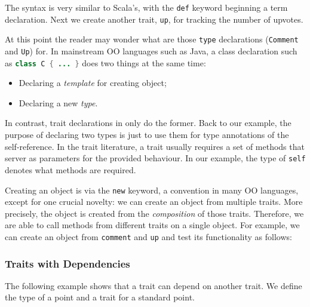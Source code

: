 
The syntax is very similar to Scala's, with the \lstinline{def} keyword
beginning a term declaration. Next we create another trait, \lstinline$up$, for
tracking the number of upvotes.


At this point the reader may wonder what are those \lstinline{type} declarations
(\lstinline$Comment$ and \lstinline$Up$) for. In mainstream OO languages such as
Java, a class declaration such as \lstinline[language=java]$class C { ... }$ does two things at
the same time:

\begin{itemize}
\item Declaring a \textit{template} for creating object;
\item Declaring a new \textit{type}.
\end{itemize}

In contrast, trait declarations in \name only do the former. Back to our
example, the purpose of declaring two types is just to use them for type
annotations of the self-reference. In the trait literature, a trait usually
requires a set of methods that server as parameters for the provided behaviour.
In our example, the type of \lstinline$self$ denotes what methods are required.

Creating an object is via the \lstinline{new} keyword, a convention in many OO
languages, except for one crucial novelty: we can create an object from multiple
traits. More precisely, the object is created from the \textit{composition} of
those traits. Therefore, we are able to call methods from different traits on a
single object. For example, we can create an object from \lstinline$comment$ and
\lstinline$up$ and test its functionality as follows:


\subsubsection{Traits with Dependencies}

The following example shows that a trait can depend on another trait. We define
the type of a point and a trait for a standard point.


